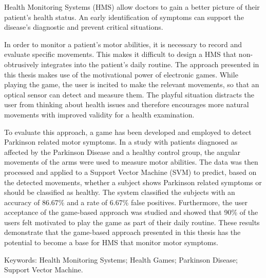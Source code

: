 Health Monitoring Systems (HMS) allow doctors to gain a better picture of their patient’s health status. An early identification of symptoms can support the disease's diagnostic and prevent critical situations.

In order to monitor a patient’s motor abilities, it is necessary to record and evaluate specific movements. This makes it difficult to design a HMS that non-obtrusively integrates into the patient’s daily routine. The approach presented in this thesis makes use of the motivational power of electronic games. While playing the game, the user is incited to make the relevant movements, so that an optical sensor can detect and measure them. The playful situation distracts the user from thinking about health issues and therefore encourages more natural movements with improved validity for a health examination.

To evaluate this approach, a game has been developed and employed to detect Parkinson related motor symptoms.  In a study with patients diagnosed as affected by the Parkinson Disease and a healthy control group, the angular movements of the arms were used to measure motor abilities. The data was then processed and applied to a Support Vector Machine (SVM) to predict, based on the detected movements, whether a subject shows Parkinson related symptoms or should be classified as healthy. The system classified the subjects with an accuracy of 86.67\% and a rate of 6.67\% false positives. Furthermore, the user acceptance of the game-based approach was studied and showed that 90\% of the users felt motivated to play the game as part of their daily routine. These results demonstrate that the game-based approach presented in this thesis has the potential to become a base for HMS that monitor motor symptoms.

Keywords: Health Monitoring Systems; Health Games; Parkinson Disease; Support Vector Machine.